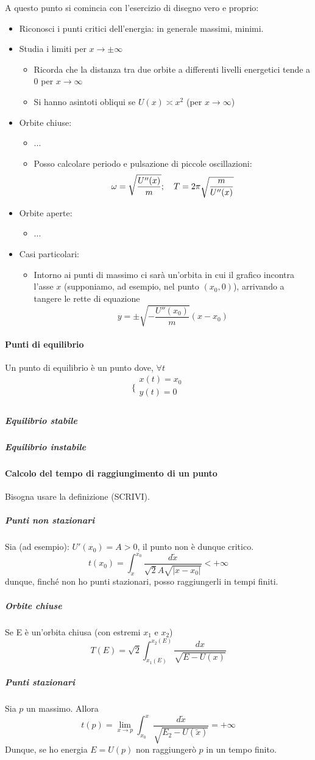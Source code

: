 \documentclass[a4paper,12pt]{article}
\begin{document}
A questo punto si comincia con l'esercizio di disegno vero e proprio:
\begin{itemize}
 \item Riconosci i punti critici dell'energia: in generale massimi, minimi.
 \item Studia i limiti per $x\to\pm\infty$
 \begin{itemize}
  \item Ricorda che la distanza tra due orbite a differenti livelli energetici tende a $0$ per $x\to\infty$
  \item Si hanno asintoti obliqui se $U(x)\asymp x^2$ (per $x\to\infty$)
 \end{itemize}

 \item Orbite chiuse:
 \begin{itemize}
  \item ...
  \item Posso calcolare periodo e pulsazione di piccole oscillazioni: $$\omega = \sqrt{U''(x)\over m};\ \ \ T = 2\pi\sqrt{m \over U''(x)}$$
 \end{itemize}
 \item Orbite aperte:
 \begin{itemize}
  \item ...
 \end{itemize}
 \item Casi particolari:
 \begin{itemize}
   \item Intorno ai punti di massimo ci sarà un'orbita in cui il grafico incontra l'asse $x$ (supponiamo, ad esempio, nel punto $(x_0, 0)$), arrivando a tangere le rette di equazione $$y = \pm\sqrt{-\dfrac{U''(x_0)}{m}}(x-x_0)$$
 \end{itemize}
\end{itemize}
\paragraph{Punti di equilibrio}
Un punto di equilibrio è un punto dove, $\forall t$
$$\bigg\{ \begin{array}{l}
x(t) = x_0\\
y(t) = 0\\
\end{array}$$
\subparagraph{Equilibrio stabile}
\subparagraph{Equilibrio instabile}

\paragraph{Calcolo del tempo di raggiungimento di un punto}
Bisogna usare la definizione (SCRIVI).
\subparagraph{Punti non stazionari}
Sia (ad esempio): $U'(x_0) = A > 0$, il punto non è dunque critico.
$$t(x_0) = \int_x^{x_0} \dfrac{d\tilde{x}}{\sqrt{2}A\sqrt{|x-x_0|}} < +\infty$$
dunque, finché non ho punti stazionari, posso raggiungerli in tempi finiti.
\subparagraph{Orbite chiuse}
Se E è un'orbita chiusa (con estremi $x_1$ e $x_2$)
$$ T(E) = \sqrt{2}\int_{x_1(E)}^{x_2(E)} \dfrac{dx}{\sqrt{E-U(x)}}$$
\subparagraph{Punti stazionari}
Sia $p$ un massimo.
Allora
$$t(p) = \lim_{x\to p} \int_{x_0}^x \dfrac{d\tilde{x}}{\sqrt{E_2 - U(\tilde{x})}} = +\infty$$
Dunque, se ho energia $E = U(p)$ non raggiungerò $p$ in un tempo finito.
\end{document}

